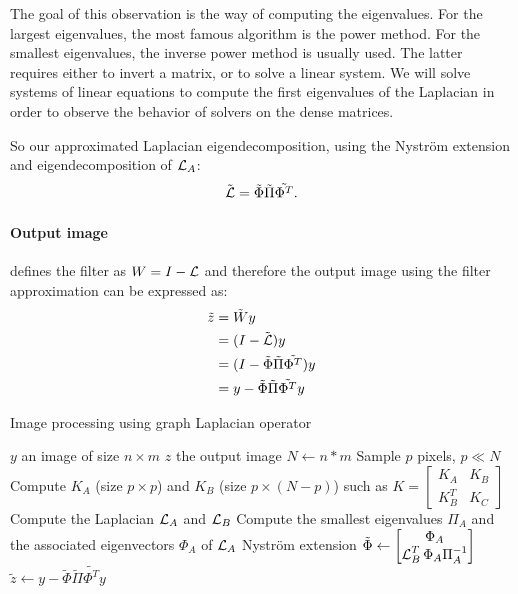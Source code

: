 The goal of this observation is the way of computing the eigenvalues.
For the largest eigenvalues, the most famous algorithm is the power method.
For the smallest eigenvalues, the inverse power method is usually used.
The latter requires either to invert a matrix, or to solve a linear system.
We will solve systems of linear equations to compute the first eigenvalues of the Laplacian in order to observe the behavior of solvers on the dense matrices.

So our approximated Laplacian eigendecomposition, using the Nystr\"om extension and eigendecomposition of \(\operatorname{\mathcal{L}}_A\):
\[\tilde{\operatorname{\mathcal{L}}} = \tilde{\Phi} \tilde{\Pi} \tilde{\Phi^T}.\]

\paragraph{Output image}
\cite{modern_tour_2013} defines the filter as \(W = I - \operatorname{\mathcal{L}}\) and therefore the output image using the filter approximation can be expressed as:
\begin{equation}
 \begin{split}
     \tilde{z} & = \tilde{W}y \\
               & = (I - \tilde{\operatorname{\mathcal{L}}}) y \\
               & = (I - \tilde{\Phi} \tilde{\Pi} \tilde{\Phi^T}) y \\
               & = y - \tilde{\Phi} \tilde{\Pi} \tilde{\Phi^T} y
 \end{split}
\end{equation}

\begin{algorithm}[H]
 \caption{Image processing using graph Laplacian operator}
 \begin{algorithmic}
  \REQUIRE \(y\) an image of size \(n \times m\)
  \ENSURE \(z\) the output image
  \STATE \(N \leftarrow n*m\)
  \STATE {}
  \STATE Sample \(p\) pixels, \(p \ll N\)
  \STATE {}
  \STATE Compute \(K_A\) (size \(p \times p\)) and \(K_B\) (size \(p \times (N-p)\)) such as \(K = \begin{bmatrix} K_A & K_B \\ K_B^T & K_C \end{bmatrix}\)
  \STATE Compute the Laplacian \(\operatorname{\mathcal{L}}_A\) and \(\operatorname{\mathcal{L}}_B\)
  \STATE {}
  \STATE Compute the smallest eigenvalues \(\Pi_A\) and the associated eigenvectors \(\Phi_A\) of \(\operatorname{\mathcal{L}}_A\)
  \STATE Nystr\"om extension \(\tilde{\Phi} \leftarrow \begin{bmatrix} \Phi_A \\ \operatorname{\mathcal{L}}_B^T \Phi_A \Pi_A^{-1} \end{bmatrix}\)
  \STATE {}
  \STATE \(\tilde{z} \leftarrow y - \tilde{\Phi} \tilde{\Pi} \tilde{\Phi^T} y\)
 \end{algorithmic}
\end{algorithm}

